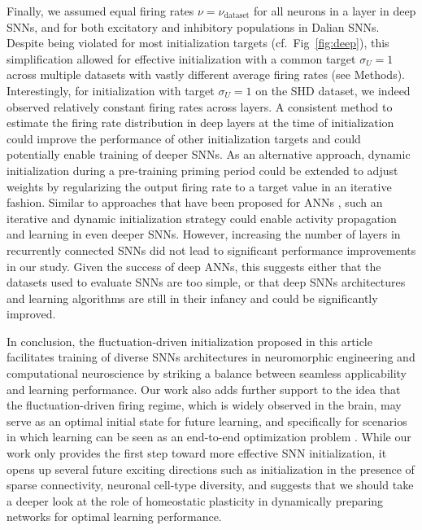 \documentclass[11pt,a4paper]{article}
\begin{document}
Finally, we assumed equal firing rates $\nu = \nu_{\mathrm{dataset}}$ for all neurons in a layer in deep \acp{SNN}, and for both excitatory and inhibitory populations in Dalian \acp{SNN}.
Despite being violated for most initialization targets (cf.\ Fig~\ref{fig:deep}), this simplification allowed for effective initialization with a common target $\sigma_U=1$ across multiple datasets with vastly different average firing rates (see Methods).
Interestingly, for initialization with target $\sigma_U=1$ on the SHD dataset, we indeed observed relatively constant firing rates across layers.
A consistent method to estimate the firing rate distribution in deep layers at the time of initialization could improve the performance of other initialization targets and could potentially enable training of deeper \acp{SNN}.
As an alternative approach, dynamic initialization during a pre-training priming period could be extended to adjust weights by regularizing the output firing rate to a target value in an iterative fashion.
Similar to approaches that have been proposed for \acp{ANN} \citep{Mishkin2015-zd}, such an iterative and dynamic initialization strategy could enable activity propagation and learning in even deeper \acp{SNN}.
However, increasing the number of layers in recurrently connected \acp{SNN} did not lead to significant performance improvements in our study. 
Given the success of deep \acp{ANN}, this suggests either that the datasets used to evaluate \acp{SNN} are too simple, or that deep \acp{SNN} architectures and learning algorithms are still in their infancy and could be significantly improved.

\medskip

In conclusion, the fluctuation-driven initialization proposed in this article 
facilitates training of diverse \acp{SNN} architectures in neuromorphic engineering and computational neuroscience by striking a balance between seamless applicability and learning performance.
Our work also adds further support to the idea that the fluctuation-driven firing regime, which is widely observed in the brain, may serve as an optimal initial state for future learning, and specifically for scenarios in which learning can be seen as an end-to-end optimization problem \citep{marblestone_toward_2016, richards_deep_2019, lillicrap_backpropagation_2020}. 
While our work only provides the first step toward more effective \ac{SNN} initialization, it opens up several future exciting directions such as initialization in the presence of sparse connectivity, neuronal cell-type diversity, and suggests that we should take a deeper look at the role of homeostatic plasticity in dynamically preparing networks for optimal learning performance.
\end{document}
